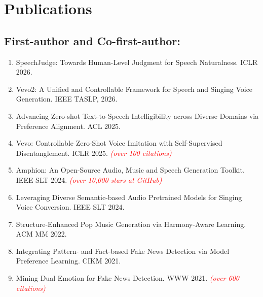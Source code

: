 \documentclass{resume}
\begin{document}
\section{Publications}

\subsection{\textbf{First-author and Co-first-author:}}
\begin{enumerate}\itemsep 0.35em
  \item SpeechJudge: Towards Human-Level Judgment for Speech Naturalness. {ICLR 2026}.
  \item Vevo2: A Unified and Controllable Framework for Speech and Singing Voice Generation. {IEEE TASLP, 2026}.
  \item Advancing Zero-shot Text-to-Speech Intelligibility across Diverse Domains via Preference Alignment. {ACL 2025}.
  \item Vevo: Controllable Zero-Shot Voice Imitation with Self-Supervised Disentanglement. {ICLR 2025}. \textcolor{red}{\textit{(over 100 citations)}}
  \item Amphion: An Open-Source Audio, Music and Speech Generation Toolkit. {IEEE SLT 2024.} \textcolor{red}{\textit{(over 10,000 stars at GitHub)}}
  \item Leveraging Diverse Semantic-based Audio Pretrained Models for Singing Voice Conversion. {IEEE SLT 2024.}
  \item Structure-Enhanced Pop Music Generation via Harmony-Aware Learning. {ACM MM 2022.}
  \item Integrating Pattern- and Fact-based Fake News Detection via Model Preference Learning. {CIKM 2021.}
  \item Mining Dual Emotion for Fake News Detection. {WWW 2021.} \textcolor{red}{\textit{(over 600 citations)}}
\end{enumerate}
\end{document}
